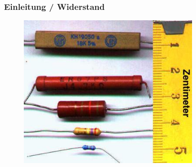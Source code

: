 \begin{frame}
  \frametitle{Einleitung / Widerstand}

  \begin{center}
    \begin{figure}
      \includegraphics[width=0.8\textwidth,height=.75\textheight,keepaspectratio]{e04/Widerstaende.jpg}
    \end{figure}
  \end{center}


\end{frame}

